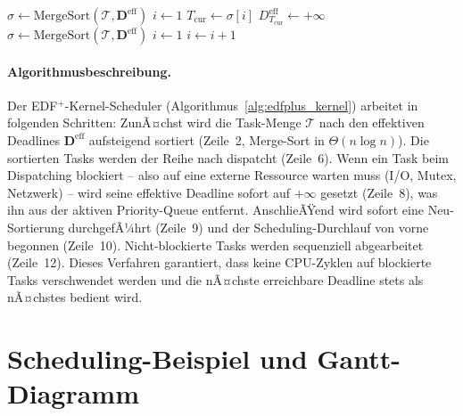 ﻿\documentclass[a4paper,12pt]{scrreprt}
\theoremstyle{definition}
\begin{document}
	\begin{algorithm}[H]
		\caption{EDF$^+$-Kernel-Scheduler}
		\label{alg:edfplus_kernel}
		\begin{algorithmic}[1]
			\State $\sigma \gets \mathrm{MergeSort}(\mathcal{T}, \mathbf{D}^{\mathrm{eff}})$
			\State $i \gets 1$
			\State $T_{\mathrm{cur}} \gets \sigma[i]$
			\State {}
			 
			\State $D_{T_{\mathrm{cur}}}^{\mathrm{eff}} \gets +\infty$
			\State $\sigma \gets \mathrm{MergeSort}(\mathcal{T}, \mathbf{D}^{\mathrm{eff}})$
			\State $i \gets 1$
			\Else
			\State $i \gets i + 1$
			\EndIf
			\EndWhile
			\EndProcedure
		\end{algorithmic}
	\end{algorithm}

	\paragraph{Algorithmusbeschreibung.}
	Der EDF$^+$-Kernel-Scheduler (Algorithmus~\ref{alg:edfplus_kernel}) arbeitet
	in folgenden Schritten: ZunÃ¤chst wird die Task-Menge $\mathcal{T}$ nach den
	effektiven Deadlines $\mathbf{D}^{\mathrm{eff}}$ aufsteigend sortiert
	(Zeile~2, Merge-Sort in $\Theta(n \log n)$). Die sortierten Tasks werden
	der Reihe nach dispatcht (Zeile~6). Wenn ein Task beim Dispatching
	blockiert -- also auf eine externe Ressource warten muss (I/O,
	Mutex, Netzwerk) -- wird seine effektive Deadline sofort auf $+\infty$
	gesetzt (Zeile~8), was ihn aus der aktiven Priority-Queue entfernt.
	AnschlieÃŸend wird sofort eine Neu-Sortierung durchgefÃ¼hrt (Zeile~9) und
	der Scheduling-Durchlauf von vorne begonnen (Zeile~10). Nicht-blockierte
	Tasks werden sequenziell abgearbeitet (Zeile~12). Dieses Verfahren
	garantiert, dass keine CPU-Zyklen auf blockierte Tasks verschwendet werden
	und die nÃ¤chste erreichbare Deadline stets als nÃ¤chstes bedient wird.

	\section{Scheduling-Beispiel und Gantt-Diagramm}
\end{document}
